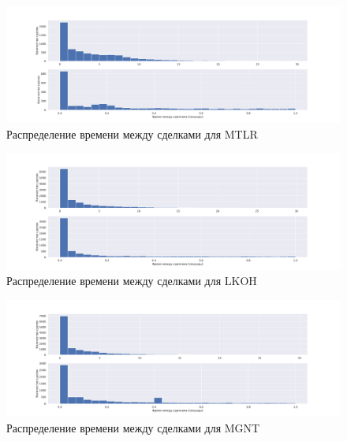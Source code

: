 \begin{figure}
        \includegraphics[scale=0.35]{fig/timedistr/SE/MTLR.pdf}
        \caption{Распределение времени между сделками для MTLR}
        \label{app}
\end{figure}
\begin{figure}
    \includegraphics[scale=0.35]{fig/timedistr/SE/LKOH.pdf}
    \caption{Распределение времени между сделками для LKOH}
    \label{app}
\end{figure}
\begin{figure}
        \includegraphics[scale=0.35]{fig/timedistr/SE/MGNT.pdf}
        \caption{Распределение времени между сделками для MGNT}
        \label{app}
\end{figure}

